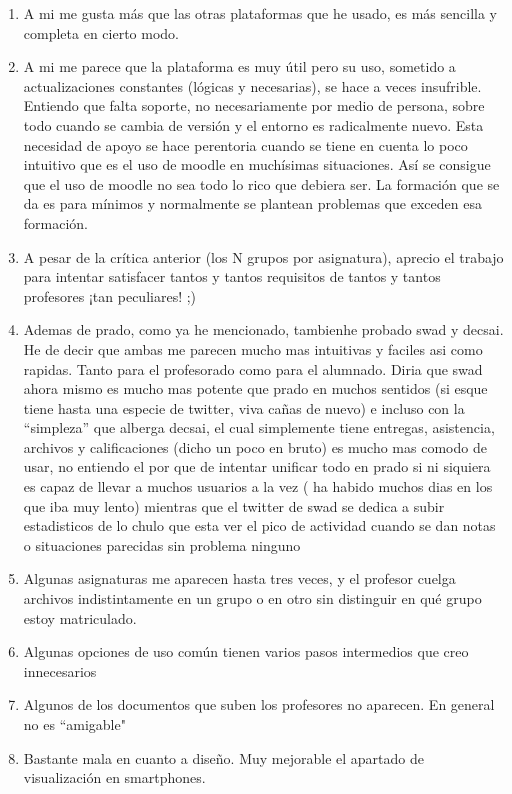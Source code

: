 \begin{enumerate}
\item A mi me gusta más que las otras plataformas que he usado, es más sencilla y completa en cierto modo.
\item A mi me parece que la plataforma es muy útil pero su uso, sometido a actualizaciones constantes (lógicas y necesarias), se hace a veces insufrible. Entiendo que falta soporte, no necesariamente por medio de persona, sobre todo cuando se cambia de versión y el entorno es radicalmente nuevo. Esta necesidad de apoyo se hace perentoria cuando se tiene en cuenta lo poco intuitivo que es el uso de moodle en muchísimas situaciones. Así se consigue que el uso de moodle no sea todo lo rico que debiera ser. La formación que se da es para mínimos y normalmente se plantean problemas que exceden esa formación.
\item A pesar de la crítica anterior (los N grupos por asignatura), aprecio el trabajo para intentar satisfacer tantos y tantos requisitos de tantos y tantos profesores ¡tan peculiares! ;)
\item Ademas de prado, como ya he mencionado, tambienhe probado swad y decsai. He de decir que ambas me parecen mucho mas intuitivas y faciles asi como rapidas. Tanto para el profesorado como para el alumnado. Diria que swad ahora mismo es mucho mas potente que prado en muchos sentidos (si esque tiene hasta una especie de twitter, viva cañas de nuevo) e incluso con la ``simpleza'' que alberga decsai, el cual simplemente tiene entregas, asistencia, archivos y calificaciones (dicho un poco en bruto) es mucho mas comodo de usar, no entiendo el por que de intentar unificar todo en prado si ni siquiera es capaz de llevar a muchos usuarios a la vez ( ha habido muchos dias en los que iba muy lento) mientras que el twitter de swad se dedica a subir estadisticos de lo chulo que esta ver el pico de actividad cuando se dan notas o situaciones parecidas sin problema ninguno
\item Algunas asignaturas me aparecen hasta tres veces, y el profesor cuelga archivos indistintamente en un grupo o en otro sin distinguir en qué grupo estoy matriculado.
\item Algunas opciones de uso común tienen varios pasos intermedios que creo innecesarios
\item Algunos de los documentos que suben los profesores no aparecen. En general no es ``amigable"
\item Bastante mala en cuanto a diseño. Muy mejorable el apartado de visualización en smartphones.

\end{enumerate}
